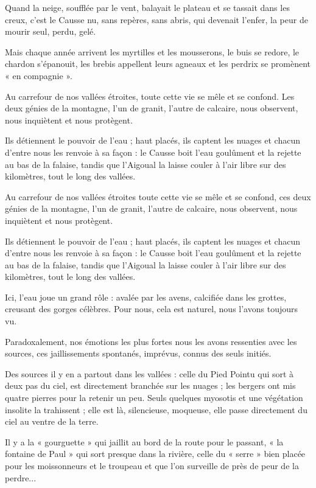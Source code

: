 Quand la neige, soufflée par le vent, balayait le plateau et se tassait dans les creux, c’est le
Causse nu, sans repères, sans abris, qui devenait l’enfer, la peur de mourir seul, perdu, gelé.

Mais chaque année arrivent les myrtilles et les mousserons, le buis se redore, le chardon
s’épanouit, les brebis appellent leurs agneaux et les perdrix se promènent « en compagnie ».

Au carrefour de nos vallées étroites, toute cette vie se mêle et se confond. Les deux génies de
la montagne, l’un de granit, l’autre de calcaire, nous observent, nous inquiètent et nous
protègent.

Ils détiennent le pouvoir de l’eau ; haut placés, ils captent les nuages et chacun d’entre nous
les renvoie à sa façon : le Causse boit l’eau goulûment et la rejette au bas de la falaise, tandis
que l’Aigoual la laisse couler à l’air libre sur des kilomètres, tout le long des vallées.


Au carrefour de nos vallées étroites toute cette vie se mêle et se confond, ces deux génies de
la montagne, l’un de granit, l’autre de calcaire, nous observent, nous inquiètent et nous
protègent.

Ils détiennent le pouvoir de l’eau ; haut placés, ils captent les nuages et chacun d’entre nous
les renvoie à sa façon : le Causse boit l’eau goulûment et la rejette au bas de la falaise, tandis
que l’Aigoual la laisse couler à l’air libre sur des kilomètres, tout le long des vallées.

Ici, l’eau joue un grand rôle : avalée par les avens, calcifiée dans les grottes, creusant des
gorges célèbres. Pour nous, cela est naturel, nous l’avons toujours vu.

Paradoxalement, nos émotions les plus fortes nous les avons ressenties avec les sources, ces
jaillissements spontanés, imprévus, connus des seuls initiés.

Des sources il y en a partout dans les vallées : celle du Pied Pointu qui sort à deux pas du ciel,
est directement branchée sur les nuages ; les bergers ont mis quatre pierres pour la retenir un
peu. Seuls quelques myosotis et une végétation insolite la trahissent ; elle est là, silencieuse,
moqueuse, elle passe directement du ciel au ventre de la terre.

Il y a la « gourguette » qui jaillit au bord de la route pour le passant, « la fontaine de
Paul » qui sort presque dans la rivière, celle du « serre » bien placée pour les moissonneurs et
le troupeau et que l’on surveille de près de peur de la perdre...

